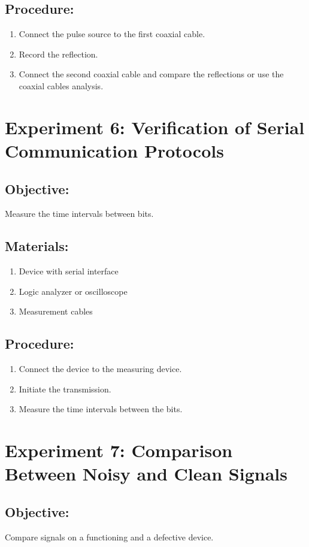 \documentclass[]{scrreprt}
\begin{document}
    \subsection*{Procedure:}
    \begin{enumerate}
        \item Connect the pulse source to the first coaxial cable.
        \item Record the reflection.
        \item Connect the second coaxial cable and compare the reflections or use the coaxial cables analysis.
    \end{enumerate}

    \section*{Experiment 6: Verification of Serial Communication Protocols}
    \subsection*{Objective:} Measure the time intervals between bits.
    \subsection*{Materials:}
    \begin{enumerate}
        \item Device with serial interface
        \item Logic analyzer or oscilloscope
        \item Measurement cables
    \end{enumerate}
    \subsection*{Procedure:}
    \begin{enumerate}
        \item Connect the device to the measuring device.
        \item Initiate the transmission.
        \item Measure the time intervals between the bits.
    \end{enumerate}

    \section*{Experiment 7: Comparison Between Noisy and Clean Signals}
    \subsection*{Objective:} Compare signals on a functioning and a defective device.
\end{document}
